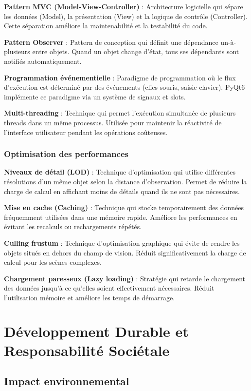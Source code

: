 \documentclass[12pt,a4paper]{report}
\begin{document}
\textbf{Pattern MVC (Model-View-Controller)} : Architecture logicielle qui sépare les données (Model), la présentation (View) et la logique de contrôle (Controller). Cette séparation améliore la maintenabilité et la testabilité du code.

\textbf{Pattern Observer} : Pattern de conception qui définit une dépendance un-à-plusieurs entre objets. Quand un objet change d'état, tous ses dépendants sont notifiés automatiquement.

\textbf{Programmation événementielle} : Paradigme de programmation où le flux d'exécution est déterminé par des événements (clics souris, saisie clavier). PyQt6 implémente ce paradigme via un système de signaux et slots.

\textbf{Multi-threading} : Technique qui permet l'exécution simultanée de plusieurs threads dans un même processus. Utilisée pour maintenir la réactivité de l'interface utilisateur pendant les opérations coûteuses.

\subsection{Optimisation des performances}

\textbf{Niveaux de détail (LOD)} : Technique d'optimisation qui utilise différentes résolutions d'un même objet selon la distance d'observation. Permet de réduire la charge de calcul en affichant moins de détails quand ils ne sont pas nécessaires.

\textbf{Mise en cache (Caching)} : Technique qui stocke temporairement des données fréquemment utilisées dans une mémoire rapide. Améliore les performances en évitant les recalculs ou rechargements répétés.

\textbf{Culling frustum} : Technique d'optimisation graphique qui évite de rendre les objets situés en dehors du champ de vision. Réduit significativement la charge de calcul pour les scènes complexes.

\textbf{Chargement paresseux (Lazy loading)} : Stratégie qui retarde le chargement des données jusqu'à ce qu'elles soient effectivement nécessaires. Réduit l'utilisation mémoire et améliore les temps de démarrage.

\chapter{Développement Durable et Responsabilité Sociétale}

\section{Impact environnemental}
\end{document}
